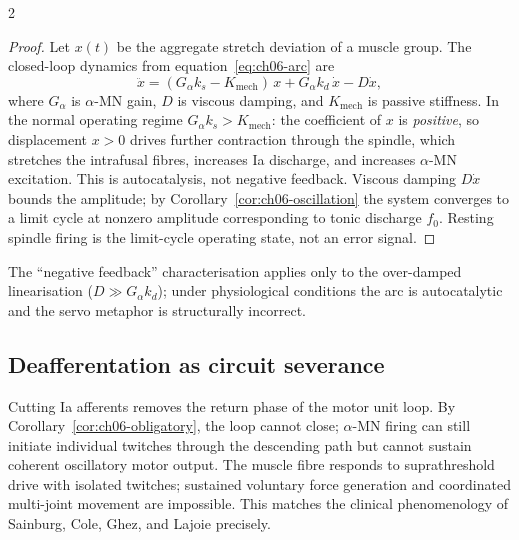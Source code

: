 \begin{multicols}{2}
\begin{proof}
Let $x(t)$ be the aggregate stretch deviation of a muscle group.  The
closed-loop dynamics from equation~\eqref{eq:ch06-arc} are
\begin{equation}
  \ddot{x} = (G_\alpha k_s - K_{\mathrm{mech}})\,x
             + G_\alpha k_d\,\dot{x} - D\dot{x},
  \label{eq:ch06-arc}
\end{equation}
where $G_\alpha$ is $\alpha$-MN gain, $D$ is viscous damping, and
$K_{\mathrm{mech}}$ is passive stiffness.  In the normal operating regime
$G_\alpha k_s > K_{\mathrm{mech}}$: the coefficient of $x$ is
\emph{positive}, so displacement $x > 0$ drives further contraction through
the spindle, which stretches the intrafusal fibres, increases Ia discharge,
and increases $\alpha$-MN excitation.  This is autocatalysis, not negative
feedback.  Viscous damping $D\dot{x}$ bounds the amplitude; by
Corollary~\ref{cor:ch06-oscillation} the system converges to a limit cycle
at nonzero amplitude corresponding to tonic discharge $f_0$.  Resting
spindle firing is the limit-cycle operating state, not an error signal.
\end{proof}

The ``negative feedback'' characterisation applies only to the
over-damped linearisation ($D \gg G_\alpha k_d$); under physiological
conditions the arc is autocatalytic and the servo metaphor is structurally
incorrect.

\subsection{Deafferentation as circuit severance}

Cutting Ia afferents removes the return phase of the motor unit loop.  By
Corollary~\ref{cor:ch06-obligatory}, the loop cannot close; $\alpha$-MN
firing can still initiate individual twitches through the descending path
but cannot sustain coherent oscillatory motor output.  The muscle fibre
responds to suprathreshold drive with isolated twitches; sustained voluntary
force generation and coordinated multi-joint movement are impossible.  This
matches the clinical phenomenology of Sainburg, Cole, Ghez, and Lajoie
\citep{sainburg1993,sainburg1995,ghez1995,lajoie1996,cole1991,cole2016}
precisely.

\end{multicols}

